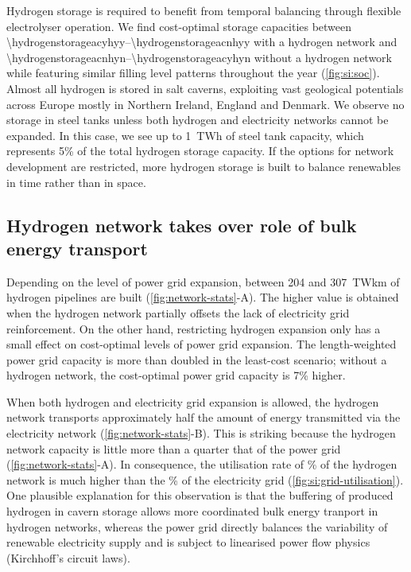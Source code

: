 Hydrogen storage is required to benefit from temporal balancing through flexible
electrolyser operation. We find cost-optimal storage capacities between
\SIrange{\hydrogenstorageacyhyy}{\hydrogenstorageacnhyy}{\twh} with a hydrogen
network and \SIrange{\hydrogenstorageacnhyn}{\hydrogenstorageacyhyn}{\twh}
without a hydrogen network while featuring similar filling level patterns
throughout the year (\cref{fig:si:soc}). Almost all hydrogen is stored in salt
caverns, exploiting vast geological potentials across Europe mostly in Northern
Ireland, England and Denmark. We observe no storage in steel tanks unless both
hydrogen and electricity networks cannot be expanded. In this case, we see up to
1~TWh of steel tank capacity, which represents 5\% of the total hydrogen storage
capacity. If the options for network development are restricted, more hydrogen
storage is built to balance renewables in time rather than in space.

\subsection*{Hydrogen network takes over role of bulk energy transport}
\label{sec:energy-moved}

Depending on the level of power grid expansion, between 204 and 307~TWkm of
hydrogen pipelines are built (\cref{fig:network-stats}-A). The higher value
is obtained when the hydrogen network partially offsets the lack of electricity
grid reinforcement. On the other hand, restricting hydrogen expansion only has a
small effect on cost-optimal levels of power grid expansion. The length-weighted
power grid capacity is more than doubled in the least-cost scenario; without a
hydrogen network, the cost-optimal power grid capacity is 7\% higher.

When both hydrogen and electricity grid expansion is allowed, the hydrogen
network transports approximately half the amount of energy transmitted via the
electricity network (\cref{fig:network-stats}-B). This is striking because
the hydrogen network capacity is little more than a quarter that of the power
grid (\cref{fig:network-stats}-A). In consequence, the utilisation rate of
\utilisationHy\% of the hydrogen network is much higher than the
\utilisationAC\% of the electricity grid (\cref{fig:si:grid-utilisation}). One
plausible explanation for this observation is that the buffering of produced
hydrogen in cavern storage allows more coordinated bulk energy tranport in
hydrogen networks, whereas the power grid directly balances the variability of
renewable electricity supply and is subject to linearised power flow physics
(Kirchhoff's circuit laws).

